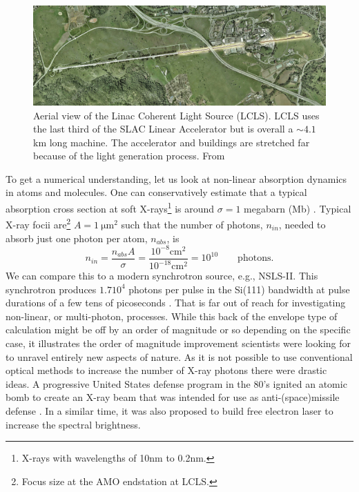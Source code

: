 \begin{figure}[t]
	\centering
		\includegraphics[width=1.00\textwidth]{images/aerial-view-lcls.jpg}
	\caption[Aerial view of the Linac Coherent Light Source.]{Aerial view of the Linac Coherent Light Source (LCLS). LCLS uses the last third of the SLAC Linear Accelerator but is overall a $\sim 4.1$ km long machine. The accelerator and buildings are stretched far because of the light generation process. From \cite{SLAC-2009-Flickr}}
	\label{fig:aerial-view-lcls}
\end{figure}
To get a numerical understanding, let us look at non-linear absorption dynamics in atoms and molecules. One can conservatively estimate that a typical absorption cross section at soft X-rays\footnote{X-rays with wavelengths of 10nm to 0.2nm.} is around $\sigma = 1$ megabarn (Mb) \cite{Bucksbaum-2011-Book}. Typical X-ray focii are\footnote{Focus size at the AMO endstation at LCLS.} $A = 1\ \mathrm{\mu m}^{2}$ such that the number of photons, $n_{in}$, needed to absorb just one photon per atom, $n_{abs}$, is
\begin{equation}
n_{in} = \frac{n_{abs} A}{\sigma} = \frac{10^{-8} \mathrm{cm}^{2}}{10^{-18} \mathrm{cm}^{2}}=10^{10}\qquad \mathrm{photons.}
\label{eq:absorption-cross-section}
\end{equation}
We can compare this to a modern synchrotron source, e.g., NSLS-II. This synchrotron produces $1.7 10^{4}$ photons per pulse in the Si(111) bandwidth at pulse durations of a few tens of picoseconds \cite{Williams-2016-PC}. That is far out of reach for investigating non-linear, or multi-photon, processes. While this back of the envelope type of calculation might be off by an order of magnitude or so depending on the specific case, it illustrates the order of magnitude improvement scientists were looking for to unravel entirely new aspects of nature. As it is not possible to use conventional optical methods to increase the number of X-ray photons there were drastic ideas. A progressive United States defense program in the 80's ignited an atomic bomb to create an X-ray beam that was intended for use as anti-(space)missile defense \cite{Hecht-2008-OPN}. In a similar time, it was also proposed to build free electron laser \cite{Kondratenko-1980-PA,Bonifacio-1984-OC} to increase the spectral brightness.

